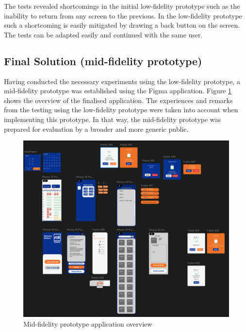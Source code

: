 \documentclass[a4paper, 11pt]{article}
\begin{document}
The tests revealed shortcomings in the initial low-fidelity prototype such as the inability to return from any screen to the previous. In the low-fidelity prototype such a shortcoming is easily mitigated by drawing a back button on the screen. The tests can be adapted easily and continued with the same user.

\newpage
\subsection{Final Solution (mid-fidelity prototype)}
Having conducted the necessary experiments using the low-fidelity prototype, a mid-fidelity prototype was established using the Figma \cite{figma} application. Figure \ref{fig:figmaOverview} shows the overview of the finalised application. The experiences and remarks from the testing using the low-fidelity prototype were taken into account when implementing this prototype. In that way, the mid-fidelity prototype was prepared for evaluation by a broader and more generic public.
\begin{figure}[h]
	\centering
	\includegraphics[width=1.0\linewidth]{figures/FigmaOverview}
	\caption{Mid-fidelity prototype application overview}
	\label{fig:figmaOverview}
\end{figure}
\newpage
\end{document}
